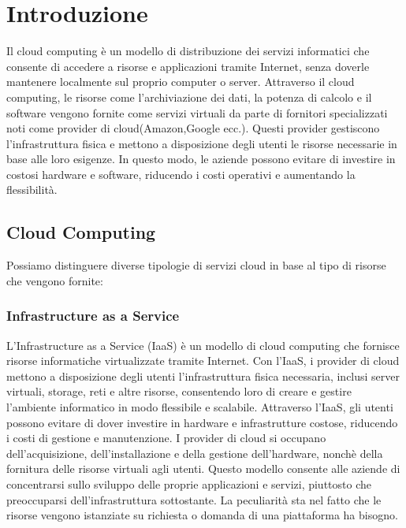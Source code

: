\documentclass[../../main.tex]{subfiles}
\begin{document}
    
\chapter{Introduzione}

Il cloud computing è un modello di distribuzione dei servizi informatici che consente di accedere a risorse e applicazioni tramite Internet, senza doverle mantenere localmente sul proprio computer o server. 
Attraverso il cloud computing, le risorse come l'archiviazione dei dati, la potenza di calcolo e il software vengono fornite come servizi virtuali da parte di fornitori specializzati noti come provider di cloud(Amazon,Google ecc.).
Questi provider gestiscono l'infrastruttura fisica e mettono a disposizione degli utenti le risorse necessarie in base alle loro esigenze. In questo modo, le aziende possono evitare di investire in costosi hardware e software, riducendo i costi operativi e aumentando la flessibilità.

\section{Cloud Computing}
Possiamo distinguere diverse tipologie di servizi cloud in base al tipo di risorse che vengono fornite:
\subsection{Infrastructure as a Service}
L'Infrastructure as a Service (IaaS) è un modello di cloud computing che fornisce risorse informatiche virtualizzate tramite Internet. Con l'IaaS, i provider di cloud mettono a disposizione degli utenti l'infrastruttura fisica necessaria, inclusi server virtuali, storage, reti e altre risorse, consentendo loro di creare e gestire l'ambiente informatico in modo flessibile e scalabile.
Attraverso l'IaaS, gli utenti possono evitare di dover investire in hardware e infrastrutture costose, riducendo i costi di gestione e manutenzione. I provider di cloud si occupano dell'acquisizione, dell'installazione e della gestione dell'hardware, nonchè della fornitura delle risorse virtuali agli utenti. Questo modello consente alle aziende di concentrarsi sullo sviluppo delle proprie applicazioni e servizi, piuttosto che preoccuparsi dell'infrastruttura sottostante.
La peculiarità sta nel fatto che le risorse vengono istanziate su richiesta o domanda di una piattaforma ha bisogno.
\end{document}
